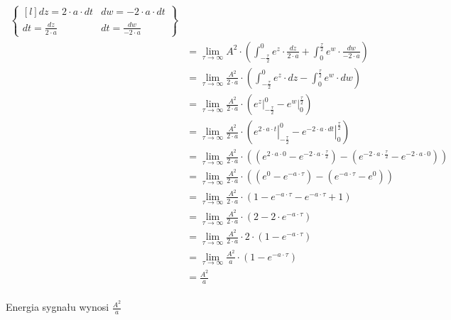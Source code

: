 \begin{align*}
\begin{Bmatrix*}[l]
   dz = 2 \cdot a \cdot dt & dw=-2 \cdot a \cdot dt\\
   dt = \frac{dz}{2\cdot a} & dt = \frac{dw}{-2 \cdot a}
   \end{Bmatrix*}\\
 &=\lim_{\tau \rightarrow \infty} A^2 \cdot \left( 
    \int_{-\frac{\tau}{2}}^{0}  e^{z} \cdot \frac{dz}{2\cdot a} 
 +  \int_{0}^{\frac{\tau}{2}} e^{w} \cdot \frac{dw}{-2\cdot a} \right)\\
 &=\lim_{\tau \rightarrow \infty} \frac{A^2}{2\cdot a} \cdot \left( 
    \int_{-\frac{\tau}{2}}^{0}  e^{z} \cdot dz 
 -  \int_{0}^{\frac{\tau}{2}} e^{w} \cdot dw \right)\\
 &=\lim_{\tau \rightarrow \infty} \frac{A^2}{2\cdot a} \cdot \left( 
    \left. e^{z} \right|_{-\frac{\tau}{2}}^{0} 
 -  \left. e^{w} \right|_{0}^{\frac{\tau}{2}} \right)\\ 
 &=\lim_{\tau \rightarrow \infty} \frac{A^2}{2\cdot a} \cdot \left( 
    \left. e^{2\cdot a \cdot t} \right|_{-\frac{\tau}{2}}^{0} 
 -  \left. e^{-2 \cdot a \cdot dt} \right|_{0}^{\frac{\tau}{2}} \right)\\ 
 &=\lim_{\tau \rightarrow \infty} \frac{A^2}{2\cdot a} \cdot \left( 
    \left(e^{2\cdot a \cdot 0} -e^{-2\cdot a \cdot \frac{\tau}{2}} \right)
 -  \left(e^{-2 \cdot a \cdot \frac{\tau}{2}}-e^{-2 \cdot a \cdot 0} \right) \right)\\ 
 &=\lim_{\tau \rightarrow \infty} \frac{A^2}{2\cdot a} \cdot \left( 
    \left(e^{0} -e^{-a \cdot \tau} \right)
 -  \left(e^{-a \cdot \tau}-e^{0} \right)\right)\\
 &=\lim_{\tau \rightarrow \infty} \frac{A^2}{2\cdot a} \cdot \left( 
    1 -e^{-a \cdot \tau} -  e^{-a \cdot \tau}+1 \right)\\
 &=\lim_{\tau \rightarrow \infty} \frac{A^2}{2\cdot a} \cdot \left( 
    2 - 2\cdot e^{-a \cdot \tau} \right)\\
 &=\lim_{\tau \rightarrow \infty} \frac{A^2}{2\cdot a} \cdot 2 \cdot \left( 
    1 - e^{-a \cdot \tau} \right)\\
 &=\lim_{\tau \rightarrow \infty} \frac{A^2}{a} \cdot \left( 
 1 - e^{-a \cdot \tau} \right)\\
 &= \frac{A^2}{a}\\
\end{align*}

Energia sygnału wynosi $\frac{A^2}{a}$
\newpage
